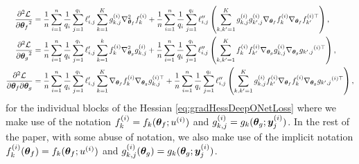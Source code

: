 \begin{align}
    \begin{aligned}
        {\frac{\partial^2 {\mathcal{L}}}{\partial {{\bm{\theta}}_f}^2}} &= 
        \frac{1}{n} \sum_{i=1}^n \frac{1}{q_i}\sum_{j=1}^{q_i} \ell_{i,j}^{\prime} \sum_{k=1}^{K} g_{k,j}^{(i)} \nabla_{{\bm{\theta}}_f}^{2} f_{k}^{(i)} 
        +
        \frac{1}{n}\sum_{i=1}^n \frac{1}{q_i} \sum_{j=1}^{q_i} \ell_{i,j}^{\prime \prime}
        \left(
            \sum_{k,k^\prime=1}^{K} g_{k,j}^{(i)}g_{k^\prime,j}^{(i)} \nabla_{{\bm{\theta}}_f} f_{k}^{(i)} \nabla_{{\bm{\theta}}_f} f_{k^\prime}^{{(i)}\top} \right),\\
        {\frac{\partial^2 {\mathcal{L}}}{\partial {{\bm{\theta}}_g}^2}} 
        &=
        \frac{1}{n} \sum_{i=1}^{n} \frac{1}{q_i} \sum_{j=1}^{q_i} \ell_{i,j}^{\prime} \sum_{k=1}^{k} f_{k}^{(i)} \nabla_{{\bm{\theta}}_g}^{2} g_{k,j}^{(i)}
        +
        \frac{1}{n}\sum_{i=1}^n \frac{1}{q_i} \sum_{j=1}^{q_i}
        \ell_{i,j}^{\prime \prime}
        \left(\sum_{k,k^\prime=1}^{K} f_{k}^{(i)}f_{k^\prime}^{(i)} \nabla_{{\bm{\theta}}_g} g_{k,j}^{(i)
        } \nabla_{
{\bm{\theta}}_g} {g_{k^\prime,j}}^{{(i)}\top}
        \right),\\
        \frac{{\partial^2{\mathcal{L}}}}{\partial{\bm{\theta}}_f\partial{\bm{\theta}}_g}
        &=
            \frac{1}{n}\sum_{i=1}^n \frac{1}{q_i} \sum_{j=1}^{q_i} 
        \ell_{i,j}^{\prime} 
        \sum_{k=1}^{K} \nabla_{{\bm{\theta}}_f} f_{k}^{(i)} \nabla_{{\bm{\theta}}_g} g_{k,j}^{(i){\top}}
        +
            \frac{1}{n}\sum_{i=1}^n \frac{1}{q_i} \sum_{j=1}^{q_i} \ell_{i,j}^{\prime \prime}
        \left(
            \sum_{k,k'=1}^{K} g_{k,j}^{(i)}f_{k'}^{(i)} \nabla_{{\bm{\theta}}_f} f_{k}^{(i)}
             \nabla_{{\bm{\theta}}_g} {g_{k',j}}^{{(i)}\top}
        \right),
    \end{aligned}
    \label{eq:Hessian_blocks_fully_Expanded}
\end{align}
for the individual blocks of the Hessian \eqref{eq:gradHessDeepONetLoss} where we make use of the notation $f^{(i)}_k = f_k ({\bm{\theta}}_f; u^{(i)})$ and $g^{(i)}_{k,j} = g_k({\bm{\theta}}_g;{\bm{y}}^{(i)}_j)$. In the rest of the paper, with some abuse of notation, we also make use of the implicit notation $f^{(i)}_k({\bm{\theta}}_f) = f_k ({\bm{\theta}}_f; u^{(i)})$ and $g^{(i)}_{k,j}({\bm{\theta}}_g) = g_k({\bm{\theta}}_g;{\bm{y}}^{(i)}_j)$.

